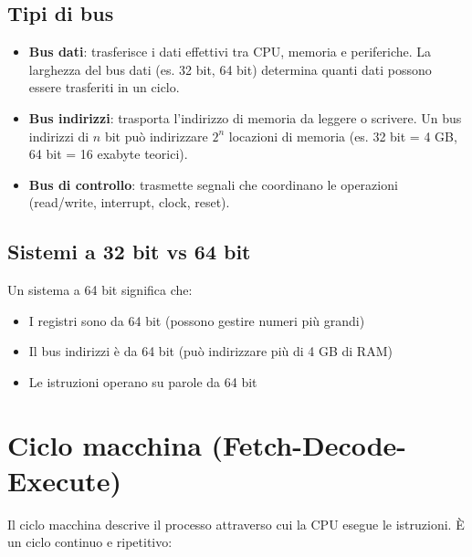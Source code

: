 \documentclass[12pt,a4paper]{article}
\begin{document}
\subsection{Tipi di bus}
\begin{itemize}
    \item \textbf{Bus dati}: trasferisce i dati effettivi tra CPU, memoria e periferiche. La larghezza del bus dati (es. 32 bit, 64 bit) determina quanti dati possono essere trasferiti in un ciclo.
    \item \textbf{Bus indirizzi}: trasporta l'indirizzo di memoria da leggere o scrivere. Un bus indirizzi di $n$ bit può indirizzare $2^n$ locazioni di memoria (es. 32 bit = 4 GB, 64 bit = 16 exabyte teorici).
    \item \textbf{Bus di controllo}: trasmette segnali che coordinano le operazioni (read/write, interrupt, clock, reset).
\end{itemize}

\subsection{Sistemi a 32 bit vs 64 bit}
Un sistema a 64 bit significa che:
\begin{itemize}
    \item I registri sono da 64 bit (possono gestire numeri più grandi)
    \item Il bus indirizzi è da 64 bit (può indirizzare più di 4 GB di RAM)
    \item Le istruzioni operano su parole da 64 bit
\end{itemize}

\section{Ciclo macchina (Fetch-Decode-Execute)}
Il ciclo macchina descrive il processo attraverso cui la CPU esegue le istruzioni. È un ciclo continuo e ripetitivo:
\end{document}
